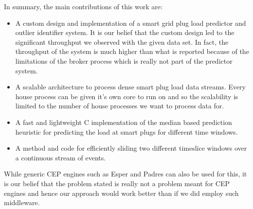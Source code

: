 
In summary, the main contributions of this work are:

\begin{itemize}
\item A custom design and implementation of a smart grid plug load predictor and outlier identifier system. It is our belief that the custom design led to the significant throughput we observed with the given data set. In fact, the throughput of the system is much higher than what is reported because of the limitations of the broker process which is really not part of the predictor system.
 \item A scalable architecture to process dense smart plug load data streams. Every house process can be given it's own core to run on and so the scalability is limited to the number of house processes we want to process data for. 
 \item A fast and lightweight C implementation of the median based prediction heuristic for predicting the load at smart plugs for different time windows.
 \item A method and code for efficiently sliding two different timeslice windows over a continuous stream of events. 
\end{itemize}

While generic CEP engines such as Esper and Padres can also be used for this, it is our belief that the problem stated is really not a problem meant for CEP engines and hence our approach would work better than if we did employ such middleware. 